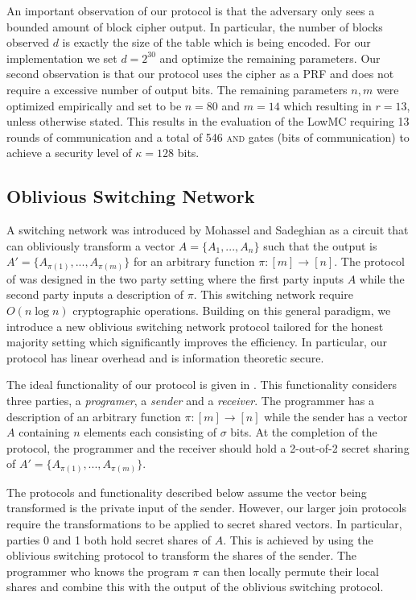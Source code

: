 An important observation of our protocol is that the adversary only sees a bounded amount of block cipher output. In particular, the number of blocks observed $d$ is exactly the size of the table which is being encoded. For our implementation we set $d=2^{30}$ and optimize the remaining parameters. Our second observation is that our protocol uses the cipher as a PRF and does not require a excessive number of output bits. The remaining parameters $n,m$ were optimized empirically and set to be $n=80$ and $m=14$ which resulting in $r=13$, unless otherwise stated. This results in the evaluation of the LowMC requiring 13 rounds of communication and a total of 546 \textsc{and} gates (bits of communication) to achieve a security level of $\kappa=128$ bits.


\subsection{Oblivious Switching Network}

A switching network was introduced by Mohassel and Sadeghian\cite{MS13} as a circuit that can obliviously transform a vector $A=\{A_1,...,A_n\}$ such that the output is $A'=\{A_{\pi(1)}, ..., A_{\pi(m)}\}$ for an arbitrary function $\pi : [m]\rightarrow[n]$. The protocol of \cite{MS13} was designed in the two party setting where the first party inputs $A$ while the second party inputs a description of $\pi$. This switching network require  $O(n\log n)$ cryptographic operations. Building on this general paradigm, we introduce a new oblivious switching network protocol tailored for the honest majority setting which significantly improves the efficiency. In particular, our protocol has linear overhead and is information theoretic secure. 

The ideal functionality of our protocol is given in . This functionality considers three parties, a \emph{programer}, a \emph{sender} and a \emph{receiver}. The programmer has a description of an arbitrary function  $\pi:[m]\rightarrow[n]$ while the sender has a vector $A$ containing $n$ elements each consisting of $\sigma$ bits. At the completion of the protocol, the programmer and the receiver should hold a 2-out-of-2 secret sharing of $A'=\{A_{\pi(1)}, ..., A_{\pi(m)}\}$.


The protocols and functionality described below assume the vector being transformed is the private input of the sender. However, our larger join protocols require the transformations to be applied to secret shared vectors. In particular, parties 0 and 1 both hold secret shares of $A$. This is achieved by using the oblivious switching protocol to transform the shares of the sender. The programmer who knows the program $\pi$ can then locally permute their local shares and combine this with the output of the oblivious switching protocol.

